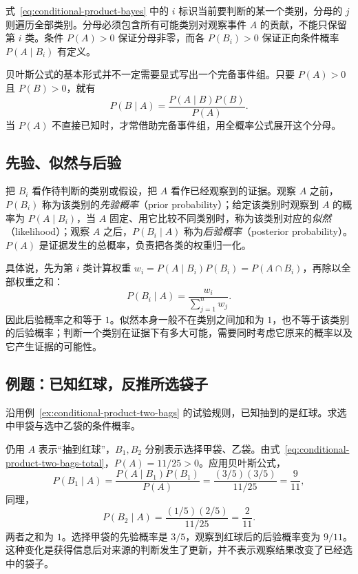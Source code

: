 \documentclass[UTF8,12pt,a4paper,fontset=fandol]{ctexart}
\begin{document}
式~\eqref{eq:conditional-product-bayes} 中的 $i$ 标识当前要判断的某一个类别，分母的 $j$ 则遍历全部类别。分母必须包含所有可能类别对观察事件 $A$ 的贡献，不能只保留第 $i$ 类。条件 $P(A)>0$ 保证分母非零，而各 $P(B_i)>0$ 保证正向条件概率 $P(A\mid B_i)$ 有定义。

贝叶斯公式的基本形式并不一定需要显式写出一个完备事件组。只要 $P(A)>0$ 且 $P(B)>0$，就有
\begin{equation}
  P(B\mid A)=\frac{P(A\mid B)P(B)}{P(A)}.
  \label{eq:conditional-product-bayes-basic}
\end{equation}
当 $P(A)$ 不直接已知时，才常借助完备事件组，用全概率公式展开这个分母。

\subsection{先验、似然与后验}

把 $B_i$ 看作待判断的类别或假设，把 $A$ 看作已经观察到的证据。观察 $A$ 之前，$P(B_i)$ 称为该类别的\emph{先验概率}（prior probability）；给定该类别时观察到 $A$ 的概率为 $P(A\mid B_i)$，当 $A$ 固定、用它比较不同类别时，称为该类别对应的\emph{似然}（likelihood）；观察 $A$ 之后，$P(B_i\mid A)$ 称为\emph{后验概率}（posterior probability）。$P(A)$ 是证据发生的总概率，负责把各类的权重归一化。

具体说，先为第 $i$ 类计算权重 $w_i=P(A\mid B_i)P(B_i)=P(A\cap B_i)$，再除以全部权重之和：
\begin{equation}
  P(B_i\mid A)=\frac{w_i}{\sum_{j=1}^{n}w_j}.
  \label{eq:conditional-product-posterior-weights}
\end{equation}
因此后验概率之和等于 $1$。似然本身一般不在类别之间加和为 $1$，也不等于该类别的后验概率；判断一个类别在证据下有多大可能，需要同时考虑它原来的概率以及它产生证据的可能性。

\subsection{例题：已知红球，反推所选袋子}

\begin{example}[由结果推断来源]
\label{ex:conditional-product-bags-posterior}
沿用例~\ref{ex:conditional-product-two-bags} 的试验规则，已知抽到的是红球。求选中甲袋与选中乙袋的条件概率。
\end{example}
\begin{solve}
仍用 $A$ 表示“抽到红球”，$B_1,B_2$ 分别表示选择甲袋、乙袋。由式~\eqref{eq:conditional-product-two-bags-total}，$P(A)=11/25>0$。应用贝叶斯公式，
\begin{equation}
  P(B_1\mid A)
  =\frac{P(A\mid B_1)P(B_1)}{P(A)}
  =\frac{(3/5)(3/5)}{11/25}
  =\frac9{11},
  \label{eq:conditional-product-bags-posterior-one}
\end{equation}
同理，
\[
  P(B_2\mid A)
  =\frac{(1/5)(2/5)}{11/25}
  =\frac2{11}.
\]
两者之和为 $1$。选择甲袋的先验概率是 $3/5$，观察到红球后的后验概率变为 $9/11$。这种变化是获得信息后对来源的判断发生了更新，并不表示观察结果改变了已经选中的袋子。
\end{solve}
\end{document}
